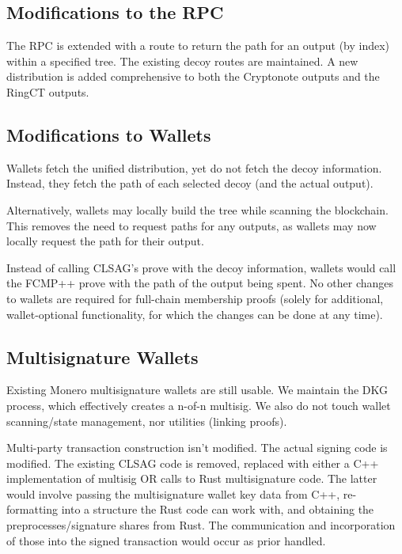 \documentclass[]{article}
\begin{document}
\subsection{Modifications to the RPC}

The RPC is extended with a route to return the path for an output (by index) within a specified tree. The existing decoy routes are maintained. A new distribution is added comprehensive to both the Cryptonote outputs and the RingCT outputs.

\subsection{Modifications to Wallets}

Wallets fetch the unified distribution, yet do not fetch the decoy information. Instead, they fetch the path of each selected decoy (and the actual output).

Alternatively, wallets may locally build the tree while scanning the blockchain. This removes the need to request paths for any outputs, as wallets may now locally request the path for their output.

Instead of calling CLSAG's prove with the decoy information, wallets would call the FCMP++ prove with the path of the output being spent. No other changes to wallets are required for full-chain membership proofs (solely for additional, wallet-optional functionality, for which the changes can be done at any time).

\subsection{Multisignature Wallets}

Existing Monero multisignature wallets are still usable. We maintain the DKG process, which effectively creates a n-of-n multisig. We also do not touch wallet scanning/state management, nor utilities (linking proofs).

Multi-party transaction construction isn't modified. The actual signing code is modified. The existing CLSAG code is removed, replaced with either a C++ implementation of multisig OR calls to Rust multisignature code. The latter would involve passing the multisignature wallet key data from C++, re-formatting into a structure the Rust code can work with, and obtaining the preprocesses/signature shares from Rust. The communication and incorporation of those into the signed transaction would occur as prior handled.
\end{document}
